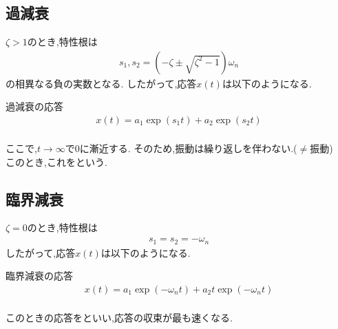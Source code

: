 \documentclass[a4paper]{jsarticle}
\begin{document}
\subsection{過減衰}
$\zeta>1$のとき,特性根は
\begin{eqnarray*}
    s_1,s_2=\left(-\zeta \pm \sqrt{\zeta^2-1}\right)\omega_n
\end{eqnarray*}
の相異なる負の実数となる.
したがって,応答$x\left(t\right)$は以下のようになる.
\begin{itembox}[l]{過減衰の応答}
    \begin{eqnarray*}
        x\left(t\right)=a_1\exp{\left(s_1t\right)}+a_2\exp{\left(s_2t\right)}\\
    \end{eqnarray*}
\end{itembox}
ここで,$t\rightarrow\infty$で$0$に漸近する.
そのため,振動は繰り返しを伴わない.($\neq$振動)\\
このとき,これをという.
\subsection{臨界減衰}
$\zeta = 0$のとき,特性根は
\begin{eqnarray*}
    s_1=s_2=-\omega_n
\end{eqnarray*}
したがって,応答$x\left(t\right)$は以下のようになる.
\begin{itembox}[l]{臨界減衰の応答}
    \begin{eqnarray*}
        x\left(t\right)=a_1\exp{\left(-\omega_nt\right)}+a_2t\exp{\left(-\omega_nt\right)}\\
    \end{eqnarray*}
\end{itembox}
このときの応答をといい,応答の収束が最も速くなる.
\end{document}
